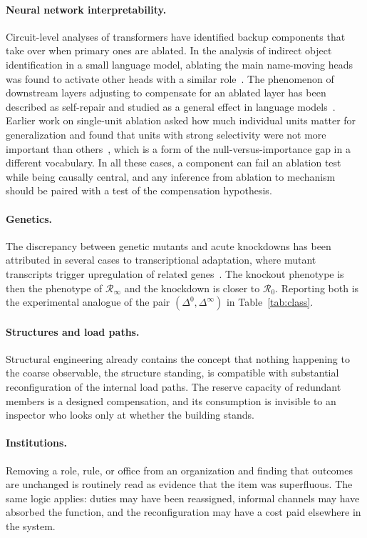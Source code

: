 \documentclass[11pt]{article}
\theoremstyle{definition}
\theoremstyle{remark}
\newcommand{\Rop}{\mathcal{R}}
\begin{document}
\paragraph{Neural network interpretability.}
Circuit-level analyses of transformers have identified backup components that take over when primary ones are ablated. In the analysis of indirect object identification in a small language model, ablating the main name-moving heads was found to activate other heads with a similar role~\cite{wang2022}. The phenomenon of downstream layers adjusting to compensate for an ablated layer has been described as self-repair and studied as a general effect in language models~\cite{mcgrath2023}. Earlier work on single-unit ablation asked how much individual units matter for generalization and found that units with strong selectivity were not more important than others~\cite{morcos2018}, which is a form of the null-versus-importance gap in a different vocabulary. In all these cases, a component can fail an ablation test while being causally central, and any inference from ablation to mechanism should be paired with a test of the compensation hypothesis.

\paragraph{Genetics.}
The discrepancy between genetic mutants and acute knockdowns has been attributed in several cases to transcriptional adaptation, where mutant transcripts trigger upregulation of related genes~\cite{rossi2015,elbrolosy2019}. The knockout phenotype is then the phenotype of $\Rop_\infty$ and the knockdown is closer to $\Rop_0$. Reporting both is the experimental analogue of the pair $(\Delta^0,\Delta^\infty)$ in Table~\ref{tab:class}.

\paragraph{Structures and load paths.}
Structural engineering already contains the concept that nothing happening to the coarse observable, the structure standing, is compatible with substantial reconfiguration of the internal load paths. The reserve capacity of redundant members is a designed compensation, and its consumption is invisible to an inspector who looks only at whether the building stands.

\paragraph{Institutions.}
Removing a role, rule, or office from an organization and finding that outcomes are unchanged is routinely read as evidence that the item was superfluous. The same logic applies: duties may have been reassigned, informal channels may have absorbed the function, and the reconfiguration may have a cost paid elsewhere in the system.
\end{document}
